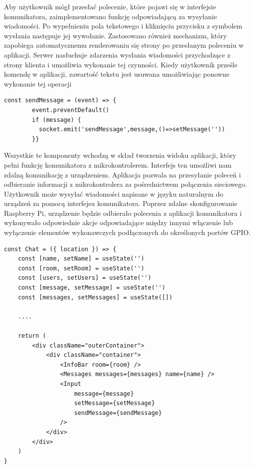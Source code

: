 Aby użytkownik mógł przesłać polecenie, które pojawi się w interfejsie komunikatora, zaimplementowano funkcję odpowiadającą za wysyłanie wiadomości. Po wypełnieniu pola tekstowego i kliknięciu przycisku z symbolem wysłania następuje jej wywołanie. Zastosowano również mechanizm, który zapobiega automatycznemu renderowaniu się strony po przesłanym poleceniu w aplikacji. Serwer nasłuchuje zdarzenia wysłania wiadomości przychodzące z strony klienta i umożliwia wykonanie tej czynności. Kiedy użytkownik prześle komendę w aplikacji, zawartość tekstu jest usuwana umożliwiając ponowne wykonanie tej operacji
\begin{lstlisting}[caption=Implementacja funkcji do wysylania wiadomosci]
const sendMessage = (event) => {
        event.preventDefault()
        if (message) {
          socket.emit('sendMessage',message,()=>setMessage(''))
       	}}
\end{lstlisting}

Wszystkie te komponenty wchodzą w skład tworzenia widoku aplikacji, który pełni funkcję komunikatora z mikrokontrolerem. Interfejs ten umożliwi nam zdalną komunikację z urządzeniem. Aplikacja pozwala na przesyłanie poleceń i odbieranie informacji z mikrokontrolera za pośrednictwem połączenia sieciowego. Użytkownik może wysyłać wiadomości napisane w języku naturalnym do urządzeń za pomocą interfejsu komunikatora. Poprzez zdalne skonfigurowanie Raspberry Pi, urządzenie będzie odbierało polecenia z aplikacji komunikatora i wykonywało odpowiednie akcje odpowiadające między innymi włączenie lub wyłączenie elementów wykonawczych podłączonych do określonych portów GPIO.
\newpage
\begin{lstlisting}[caption=Implementacja komponentu czatu]
const Chat = ({ location }) => {
    const [name, setName] = useState('')
    const [room, setRoom] = useState('')
    const [users, setUsers] = useState('')
    const [message, setMessage] = useState('')
    const [messages, setMessages] = useState([])

	....	

    return (
        <div className="outerContainer">
            <div className="container">
                <InfoBar room={room} />
                <Messages messages={messages} name={name} />
                <Input
                    message={message}
                    setMessage={setMessage}
                    sendMessage={sendMessage}
                />
            </div>
        </div>
    )
}
\end{lstlisting}
